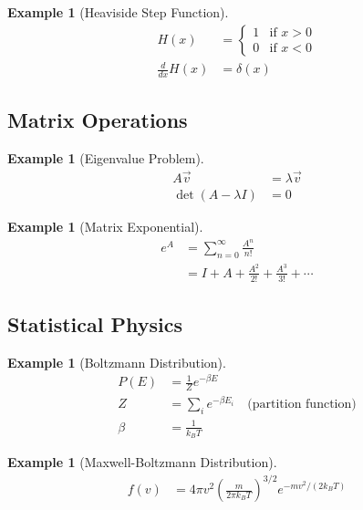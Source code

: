 \documentclass{article}
\newtheorem{example}[theorem]{Example}
\begin{document}
\begin{example}[Heaviside Step Function]
\begin{align*}
    H(x) &= \begin{cases}
        1 & \text{if } x > 0 \\
        0 & \text{if } x < 0
    \end{cases} \\
    \frac{d}{dx}H(x) &= \delta(x)
\end{align*}
\end{example}

\subsection{Matrix Operations}

\begin{example}[Eigenvalue Problem]
\begin{align*}
    A\vec{v} &= \lambda\vec{v} \\
    \det(A - \lambda I) &= 0
\end{align*}
\end{example}

\begin{example}[Matrix Exponential]
\begin{align*}
    e^A &= \sum_{n=0}^{\infty} \frac{A^n}{n!} \\
    &= I + A + \frac{A^2}{2!} + \frac{A^3}{3!} + \cdots
\end{align*}
\end{example}

\subsection{Statistical Physics}

\begin{example}[Boltzmann Distribution]
\begin{align*}
    P(E) &= \frac{1}{Z}e^{-\beta E} \\
    Z &= \sum_i e^{-\beta E_i} \quad \text{(partition function)} \\
    \beta &= \frac{1}{k_B T}
\end{align*}
\end{example}

\begin{example}[Maxwell-Boltzmann Distribution]
\begin{align*}
    f(v) &= 4\pi v^2\left(\frac{m}{2\pi k_B T}\right)^{3/2}e^{-mv^2/(2k_B T)}
\end{align*}
\end{example}
\end{document}
